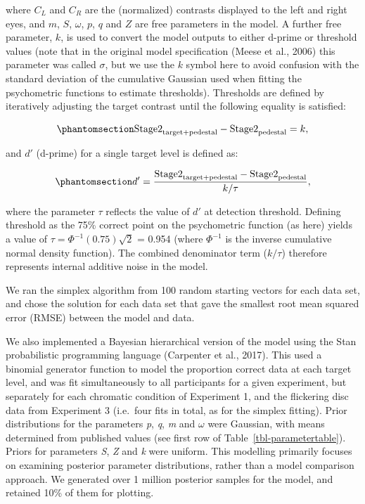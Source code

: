 \documentclass[
  letterpaper,
  DIV=11,
  numbers=noendperiod]{scrartcl}
\begin{document}
where \(C_L\) and \(C_R\) are the (normalized) contrasts displayed to
the left and right eyes, and \(m\), \(S\), \(\omega\), \(p\), \(q\) and
\(Z\) are free parameters in the model. A further free parameter, \(k\),
is used to convert the model outputs to either d-prime or threshold
values (note that in the original model specification (Meese et al.,
2006) this parameter was called \(\sigma\), but we use the \(k\) symbol
here to avoid confusion with the standard deviation of the cumulative
Gaussian used when fitting the psychometric functions to estimate
thresholds). Thresholds are defined by iteratively adjusting the target
contrast until the following equality is satisfied:

\begin{equation}\phantomsection\label{eq-thd}{\mathrm{Stage2}_{\mathrm{target+pedestal}} - \mathrm{Stage2}_{\mathrm{pedestal}} = k,}\end{equation}

and \(d'\) (d-prime) for a single target level is defined as:

\begin{equation}\phantomsection\label{eq-dprime}{d' = \frac{\mathrm{Stage2}_{\mathrm{target+pedestal}} - \mathrm{Stage2}_{\mathrm{pedestal}}}{k/\tau},}\end{equation}

where the parameter \(\tau\) reflects the value of \(d'\) at detection
threshold. Defining threshold as the 75\% correct point on the
psychometric function (as here) yields a value of
\(\tau = \Phi^{-1}(0.75)\sqrt{2}\) = 0.954 (where \(\Phi^{-1}\) is the
inverse cumulative normal density function). The combined denominator
term (\(k/\tau\)) therefore represents internal additive noise in the
model.

We ran the simplex algorithm from 100 random starting vectors for each
data set, and chose the solution for each data set that gave the
smallest root mean squared error (RMSE) between the model and data.

We also implemented a Bayesian hierarchical version of the model using
the Stan probabilistic programming language (Carpenter et al., 2017).
This used a binomial generator function to model the proportion correct
data at each target level, and was fit simultaneously to all
participants for a given experiment, but separately for each chromatic
condition of Experiment 1, and the flickering disc data from Experiment
3 (i.e.~four fits in total, as for the simplex fitting). Prior
distributions for the parameters \emph{p}, \emph{q}, \emph{m} and
\(\omega\) were Gaussian, with means determined from published values
(see first row of Table~\ref{tbl-parametertable}). Priors for parameters
\emph{S}, \emph{Z} and \emph{k} were uniform. This modelling primarily
focuses on examining posterior parameter distributions, rather than a
model comparison approach. We generated over 1 million posterior samples
for the model, and retained 10\% of them for plotting.
\end{document}
